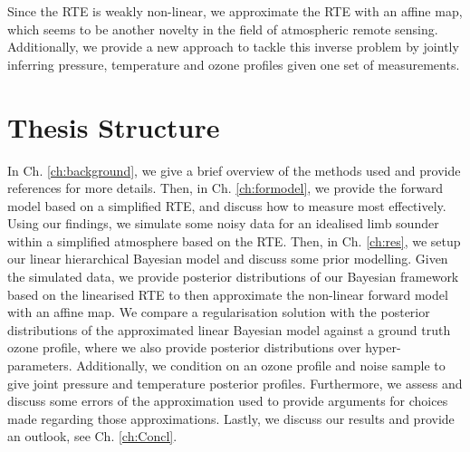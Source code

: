 Since the RTE is weakly non-linear, we approximate the RTE with an affine map, which seems to be another novelty in the field of atmospheric remote sensing.
Additionally, we provide a new approach to tackle this inverse problem by jointly inferring pressure, temperature and ozone profiles given one set of measurements.



\section{Thesis Structure}
In Ch. \ref{ch:background}, we give a brief overview of the methods used and provide references for more details.
Then, in Ch. \ref{ch:formodel}, we provide the forward model based on a simplified RTE, and discuss how to measure most effectively.
Using our findings, we simulate some noisy data for an idealised limb sounder within a simplified atmosphere based on the RTE.
Then, in Ch. \ref{ch:res}, we setup our linear hierarchical Bayesian model and discuss some prior modelling.
Given the simulated data, we provide posterior distributions of our Bayesian framework based on the linearised RTE to then approximate the non-linear forward model with an affine map. 
We compare a regularisation solution with the posterior distributions of the approximated linear Bayesian model against a ground truth ozone profile, where we also provide posterior distributions over hyper-parameters.
Additionally, we condition on an ozone profile and noise sample to give joint pressure and temperature posterior profiles.
Furthermore, we assess and discuss some errors of the approximation used to provide arguments for choices made regarding those approximations.
Lastly, we discuss our results and provide an outlook, see Ch. \ref{ch:Concl}.